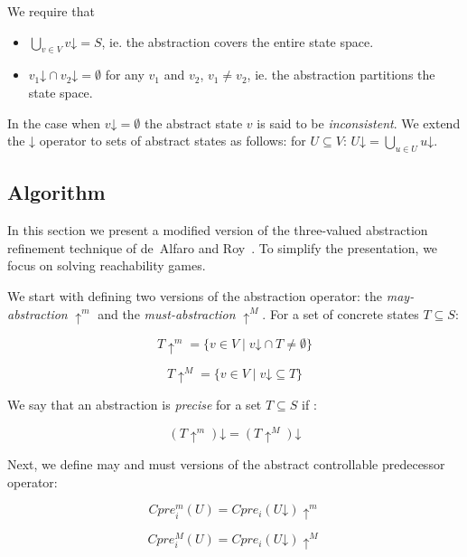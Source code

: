 \documentclass{book}
\newcommand{\concrete}[1]{#1\mathord{\downarrow}}
\newcommand{\abstractm}[1]{#1\mathord{\uparrow^m}}
\newcommand{\abstractM}[1]{#1\mathord{\uparrow^M}}
\theoremstyle{definition}
\begin{document}
We require that 
\begin{itemize}
    \item $\bigcup_{v\in V}\concrete{v} = S$, ie. the abstraction covers the entire state space. 
    \item $\concrete{v_1}\cap \concrete{v_2} = \emptyset$ for any $v_1$ and $v_2$, $v_1 \neq v_2$, ie. the abstraction partitions the state space.
\end{itemize}

In the case when $\concrete{v} = \emptyset$ the abstract state $v$ is said to be \emph{inconsistent}. We extend the $\concrete{}$ operator to sets of abstract states as follows: for $U\subseteq V$: $\concrete{U} = \bigcup_{u\in U}\concrete{u}$.

\subsection{Algorithm}
In this section we present a modified version of the three-valued abstraction refinement technique of de~Alfaro and Roy~\cite{Alfaro_Roy_07}. To simplify the presentation, we focus on solving reachability games. 

We start with defining two versions of the abstraction operator: the \emph{may-abstraction} $\abstractm{}$ and the \emph{must-abstraction} $\abstractM{}$. For a set of concrete states $T \subseteq S$:

\begin{equation}
\abstractm{T} = \{v\in V\mid \concrete{v} \cap T \neq \emptyset\} 
\end{equation}

\begin{equation}
\abstractM{T} = \{v\in V\mid \concrete{v} \subseteq T \}
\end{equation}

We say that an abstraction is \emph{precise} for a set $T\subseteq S$ if :

\begin{equation}
\concrete{(\abstractm{T})} = \concrete{(\abstractM{T})}
\end{equation}

Next, we define may and must versions of the abstract controllable predecessor operator:

\begin{equation}
    Cpre_i^m(U) = \abstractm{Cpre_i(\concrete{U})}
\end{equation}

\begin{equation}
    Cpre_i^M(U) = \abstractM{Cpre_i(\concrete{U})}
\end{equation}
\end{document}
